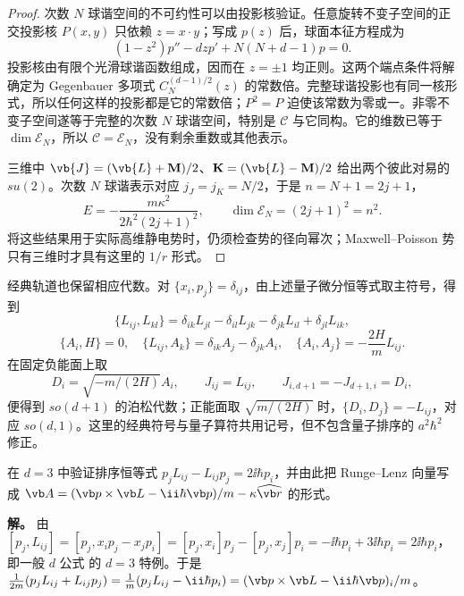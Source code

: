 \begin{proof}
次数 $N$ 球谐空间的不可约性可以由投影核验证。任意旋转不变子空间的正交投影核 $P(x,y)$ 只依赖 $z=x\cdot y$；写成 $p(z)$ 后，球面本征方程成为
\[
 (1-z^2)p''-d z p'+N(N+d-1)p=0.
\]
投影核由有限个光滑球谐函数组成，因而在 $z=\pm1$ 均正则。这两个端点条件将解确定为 Gegenbauer 多项式 $C_N^{(d-1)/2}(z)$ 的常数倍。完整球谐投影也有同一核形式，所以任何这样的投影都是它的常数倍；$P^2=P$ 迫使该常数为零或一。非零不变子空间遂等于完整的次数 $N$ 球谐空间，特别是 $\mathcal C$ 与它同构。它的维数已等于 $\dim\mathcal E_N$，所以 $\mathcal C=\mathcal E_N$，没有剩余重数或其他表示。

三维中 $\vb{J}=(\vb{L}+\mathbf M)/2$、$\mathbf K=(\vb{L}-\mathbf M)/2$ 给出两个彼此对易的 $su(2)$。次数 $N$ 球谐表示对应 $j_J=j_K=N/2$，于是 $n=N+1=2j+1$，
\begin{equation}
 E=-\frac{m\kappa^2}{2\hbar^2(2j+1)^2},\qquad \dim\mathcal E_N=(2j+1)^2=n^2.
 \label{eq:phys-hdqm-so4-energy}
\end{equation}
将这些结果用于实际高维静电势时，仍须检查势的径向幂次；Maxwell--Poisson 势只有三维时才具有这里的 $1/r$ 形式。
\end{proof}

经典轨道也保留相应代数。对 $\{x_i,p_j\}=\delta_{ij}$，由上述量子微分恒等式取主符号，得到
\begin{equation}
 \{L_{ij},L_{kl}\}=\delta_{ik}L_{jl}-\delta_{il}L_{jk}
                       -\delta_{jk}L_{il}+\delta_{jl}L_{ik},
 \label{eq:phys-hdqm-sod-bracket}
\end{equation}
\begin{equation}
 \{A_i,H\}=0,\quad
 \{L_{ij},A_k\}=\delta_{ik}A_j-\delta_{jk}A_i,
 \quad\{A_i,A_j\}=-\frac{2H}{m}L_{ij}.
 \label{eq:phys-hdqm-runge-lenz-brackets}
\end{equation}
在固定负能面上取
\begin{equation}
 D_i=\sqrt{-m/(2H)}A_i,\qquad J_{ij}=L_{ij},\qquad
 J_{i,d+1}=-J_{d+1,i}=D_i,
 \label{eq:phys-hdqm-sod1-generators}
\end{equation}
便得到 $so(d+1)$ 的泊松代数；正能面取 $\sqrt{m/(2H)}$ 时，$\{D_i,D_j\}=-L_{ij}$，对应 $so(d,1)$。这里的经典符号与量子算符共用记号，但不包含量子排序的 $a^2\hbar^2$ 修正。

\begin{workedexample}
在 \(d=3\) 中验证排序恒等式 \(p_jL_{ij}-L_{ij}p_j=2\ii\hbar p_i\)，并由此把 Runge--Lenz 向量写成 \(\vb A=(\vb p\times\vb L-\ii\hbar\vb p)/m-\kappa\widehat{\vb r}\) 的形式。

\textbf{解。} 由 \([p_j,L_{ij}]=[p_j,x_ip_j-x_jp_i]=[p_j,x_i]p_j-[p_j,x_j]p_i=-\ii\hbar p_i+3\ii\hbar p_i=2\ii\hbar p_i\)，即一般 \(d\) 公式 的 \(d=3\) 特例。于是 \(\frac{1}{2m}(p_jL_{ij}+L_{ij}p_j)=\frac1m(p_jL_{ij}-\ii\hbar p_i)=(\vb p\times\vb L-\ii\hbar\vb p)_i/m\)。
\end{workedexample}

